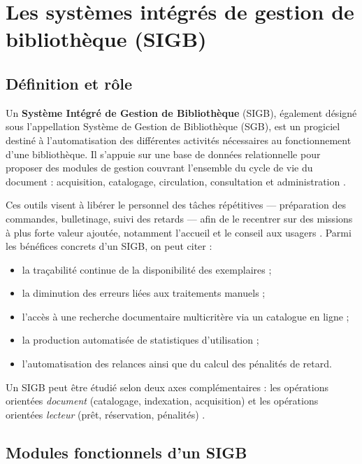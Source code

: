 \section{Les systèmes intégrés de gestion de bibliothèque (SIGB)}

\subsection{Définition et rôle}

Un \textbf{Système Intégré de Gestion de Bibliothèque} (SIGB), également désigné
sous l'appellation Système de Gestion de Bibliothèque (SGB), est un progiciel
destiné à l'automatisation des différentes activités nécessaires au fonctionnement
d'une bibliothèque. Il s'appuie sur une base de données relationnelle pour
proposer des modules de gestion couvrant l'ensemble du cycle de vie du document :
acquisition, catalogage, circulation, consultation et administration
\cite{Chowdhury_Burton_McMenemy_Poulter_2007}.

Ces outils visent à libérer le personnel des tâches répétitives — préparation
des commandes, bulletinage, suivi des retards — afin de le recentrer sur des
missions à plus forte valeur ajoutée, notamment l'accueil et le conseil aux
usagers \cite{oyekale2018ils}
. Parmi les bénéfices concrets d'un SIGB, on peut citer :

\begin{itemize}
\item la traçabilité continue de la disponibilité des exemplaires ;
\item la diminution des erreurs liées aux traitements manuels ;
\item l’accès à une recherche documentaire multicritère via un catalogue en ligne ;
\item la production automatisée de statistiques d’utilisation ;
\item l’automatisation des relances ainsi que du calcul des pénalités de retard.
\end{itemize}

Un SIGB peut être étudié selon deux axes complémentaires : les opérations
orientées \emph{document} (catalogage, indexation, acquisition) et les
opérations orientées \emph{lecteur} (prêt, réservation, pénalités)
.

\subsection{Modules fonctionnels d'un SIGB}

